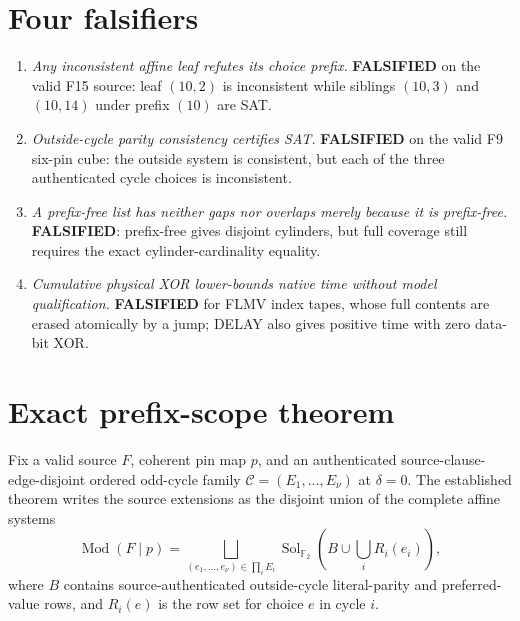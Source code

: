 \documentclass[11pt]{article}
\newcommand{\GF}{\mathbb F_2}
\begin{document}
\section{Four falsifiers}
\begin{enumerate}
\item \emph{Any inconsistent affine leaf refutes its choice prefix.}
\textbf{FALSIFIED} on the valid F15 source: leaf $(10,2)$ is inconsistent while
siblings $(10,3)$ and $(10,14)$ under prefix $(10)$ are SAT.
\item \emph{Outside-cycle parity consistency certifies SAT.}
\textbf{FALSIFIED} on the valid F9 six-pin cube: the outside system is
consistent, but each of the three authenticated cycle choices is inconsistent.
\item \emph{A prefix-free list has neither gaps nor overlaps merely because it
is prefix-free.} \textbf{FALSIFIED}: prefix-free gives disjoint cylinders, but
full coverage still requires the exact cylinder-cardinality equality.
\item \emph{Cumulative physical XOR lower-bounds native time without model
qualification.} \textbf{FALSIFIED} for FLMV index tapes, whose full contents
are erased atomically by a jump; DELAY also gives positive time with zero
data-bit XOR.
\end{enumerate}

\section{Exact prefix-scope theorem}
Fix a valid source $F$, coherent pin map $p$, and an authenticated
source-clause-edge-disjoint ordered odd-cycle family
$\mathcal C=(E_1,\ldots,E_\nu)$ at $\delta=0$. The established theorem writes
the source extensions as the disjoint union of the complete affine systems
\[
 \operatorname{Mod}(F\mid p)=
 \bigsqcup_{(e_1,\ldots,e_\nu)\in\prod_iE_i}
 \operatorname{Sol}_{\GF}\!\left(B\cup\bigcup_iR_i(e_i)\right),
\]
where $B$ contains source-authenticated outside-cycle literal-parity and
preferred-value rows, and $R_i(e)$ is the row set for choice $e$ in cycle $i$.
\end{document}
